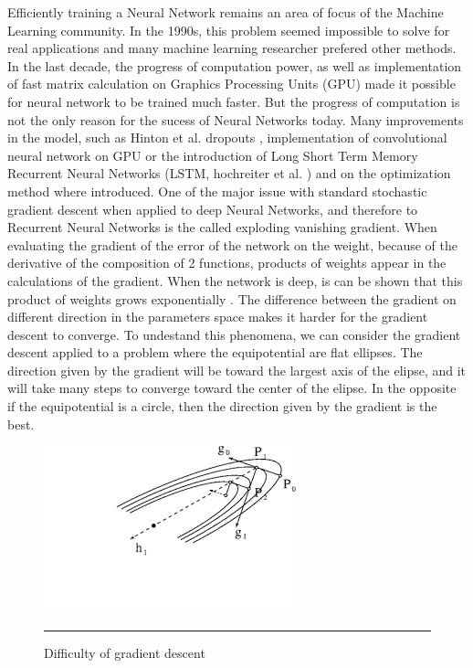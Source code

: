 Efficiently training a Neural Network remains an area of focus of the Machine Learning community. In the 1990s, this problem seemed impossible to solve for real applications and many machine learning researcher prefered other methods. In the last decade, the progress of computation power, as well as implementation of fast matrix calculation on Graphics Processing Units (GPU) made it possible for neural network to be trained much faster. But the progress of computation is not the only reason for the sucess of Neural Networks today. Many improvements in the model, such as Hinton et al. dropouts \cite{dahl2013improving}, implementation of convolutional neural network on GPU \cite{krizhevsky2012imagenet} or the introduction of Long Short Term Memory Recurrent Neural Networks (LSTM, hochreiter et al. \cite{hochreiter1997long}) and on the optimization method where introduced. One of the major issue with standard stochastic gradient descent when applied to deep Neural Networks, and therefore to Recurrent Neural Networks is the called exploding vanishing gradient. When evaluating the gradient of the error of the network on the weight, because of the derivative of the composition of 2 functions, products of weights appear in the calculations of the gradient. When the network is deep, is can be shown that this product of weights grows exponentially \cite{pascanu2012difficulty}. The difference between the gradient on different direction in the parameters space makes it harder for the gradient descent to converge. To undestand this phenomena, we can consider the gradient descent applied to a problem where the equipotential are flat ellipses. The direction given by the gradient will be toward the largest axis of the elipse, and it will take many steps to converge toward the center of the elipse. In the opposite if the equipotential is a circle, then the direction given by the gradient is the best. 


\begin{figure}[htbp]
    \centering
    \includegraphics[scale=0.7]{Figures/gradient_ellipse.jpg}
    \rule{35em}{0.5pt}
    \caption[Difficulty of gradient descent]{Difficulty of gradient descent}
    \label{fig:gradient_elipse}
\end{figure}

